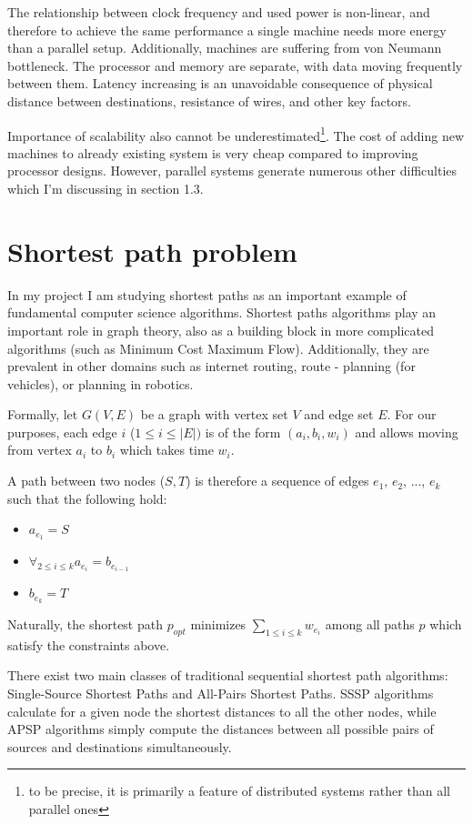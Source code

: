 \documentclass[12pt,a4paper,twoside,openright]{report}
\begin{document}
The relationship between clock frequency and used power is non-linear, and therefore to achieve the same performance a single machine needs more energy than a parallel setup. Additionally, machines are suffering from von Neumann bottleneck. The processor and memory are separate, with data moving frequently between them. Latency increasing is an unavoidable consequence of physical distance between destinations, resistance of wires, and other key factors. 

Importance of scalability also cannot be underestimated\footnote{to be precise, it is primarily a feature of distributed systems rather than all parallel ones}. The cost of adding new machines to already existing system is very cheap compared to improving processor designs. 
However, parallel systems generate numerous other difficulties which I'm discussing in section 1.3.

\section{Shortest path problem}
In my project I am studying shortest paths as an important example of fundamental computer science algorithms. Shortest paths algorithms play an important role in graph theory, also as a building block in more complicated algorithms (such as Minimum Cost Maximum Flow). Additionally, they are prevalent in other domains such as internet routing, route - planning (for vehicles), or planning in robotics. 

Formally, let $G(V,E)$ be a graph with vertex set $V$ and edge set $E$. For our purposes, each edge $i$ ($1\leq i\leq |E|)$ is of the form $(a_i, b_i, w_i)$ and allows moving from vertex $a_i$ to $b_i$ which takes time $w_i$. 

A path between two nodes ($S, T$) is therefore a sequence of edges $e_1$, $e_2$, ..., $e_k$ such that the following hold:
\begin{itemize}
    \item $a_{e_1} = S$
    \item $\displaystyle\mathop{\forall}_{2\leq i \leq k} a_{e_{i}} = b_{e_{i-1}}$
    \item $b_{e_k} = T$
\end{itemize}

Naturally, the shortest path $p_{opt}$ minimizes $\displaystyle\mathop{\sum}_{1\leq i \leq k} w_{e_i}$ among all paths $p$ which satisfy the constraints above.

There exist two main classes of traditional sequential shortest path algorithms: Single-Source Shortest Paths and All-Pairs Shortest Paths. SSSP algorithms calculate for a given node the shortest distances to all the other nodes, while APSP algorithms simply compute the distances between all possible pairs of sources and destinations simultaneously.
\end{document}
